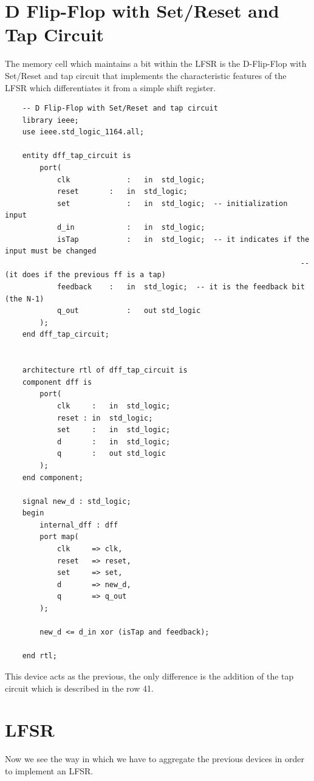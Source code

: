 \documentclass[a4paper]{report}
\begin{document}
\section{D Flip-Flop with Set/Reset and Tap Circuit}
The memory cell which maintains a bit within the LFSR is the D-Flip-Flop with Set/Reset and tap circuit that implements the characteristic features of the LFSR which differentiates it from a simple shift register.
\begin{lstlisting}
	-- D Flip-Flop with Set/Reset and tap circuit
	library ieee;
	use ieee.std_logic_1164.all;
	
	entity dff_tap_circuit is
		port(
			clk				:	in 	std_logic;
			reset 		:	in 	std_logic;
			set				:	in 	std_logic;  -- initialization input
			d_in			:	in 	std_logic;	
			isTap			:	in 	std_logic;	-- it indicates if the input must be changed
																	-- (it does if the previous ff is a tap)
			feedback	:	in 	std_logic;  -- it is the feedback bit (the N-1)
			q_out			:	out std_logic
		);
	end dff_tap_circuit;
	
	
	architecture rtl of dff_tap_circuit is
	component dff is
		port(
			clk		:	in 	std_logic;
			reset :	in 	std_logic;
			set		:	in 	std_logic;
			d 		:	in 	std_logic;
			q 		:	out std_logic
		);
	end component;
	
	signal new_d : std_logic;
	begin
		internal_dff : dff
		port map(
			clk 	=> clk,
			reset	=> reset,
			set 	=> set,
			d 		=> new_d,
			q 		=> q_out
		);
		
		new_d <= d_in xor (isTap and feedback);
	
	end rtl;
\end{lstlisting}
This device acts as the previous, the only difference is the addition of the tap circuit which is described in the row 41.

\section{LFSR}
Now we see the way in which we have to aggregate the previous devices in order to implement an LFSR.
\end{document}

